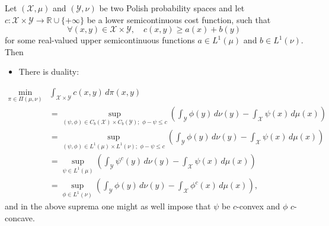 \begin{theorem}
\label{eq:kantarovich}
Let $(\mathcal{X}, \mu)$ and $(\mathcal{Y}, \nu)$ be two Polish probability spaces and let $c : \mathcal{X} \times \mathcal{Y} \to \mathbb{R} \cup \{+\infty\}$ be a lower semicontinuous cost function, such that
\begin{equation*}
    \forall(x,y) \in \mathcal{X} \times \mathcal{Y}, \quad c(x,y) \geq a(x) + b(y)
\end{equation*}
for some real-valued upper semicontinuous functions $a \in L^1(\mu)$ and $b \in L^1(\nu)$. Then
\begin{itemize}
    \item[(i)] There is duality:
\end{itemize}
\begin{align*}
    \min_{\pi \in \Pi(\mu, \nu)} & \int_{\mathcal{X} \times \mathcal{Y}} c(x, y) \, d\pi(x, y) \\
    &= \sup_{(\psi, \phi) \in C_b(\mathcal{X}) \times C_b(\mathcal{Y}); \,\, \phi-\psi \leq c} \left( \int_{\mathcal{Y}} \phi(y) \, d\nu(y) - \int_{\mathcal{X}} \psi(x) \, d\mu(x) \right) \\
    &= \sup_{(\psi, \phi) \in L^1(\mu) \times L^1(\nu); \,\, \phi-\psi \leq c} \left( \int_{\mathcal{Y}} \phi(y) \, d\nu(y) - \int_{\mathcal{X}} \psi(x) \, d\mu(x) \right) \\
    &= \sup_{\psi \in L^1(\mu)} \left( \int_{\mathcal{Y}} \psi^c(y) \, d\nu(y) - \int_{\mathcal{X}} \psi(x) \, d\mu(x) \right) \\
    &= \sup_{\phi \in L^1(\nu)} \left( \int_{\mathcal{Y}} \phi(y) \, d\nu(y) - \int_{\mathcal{X}} \phi^c(x) \, d\mu(x) \right),
\end{align*}
and in the above suprema one might as well impose that $\psi$ be $c$-convex and $\phi$ $c$-concave.
\end{theorem}

